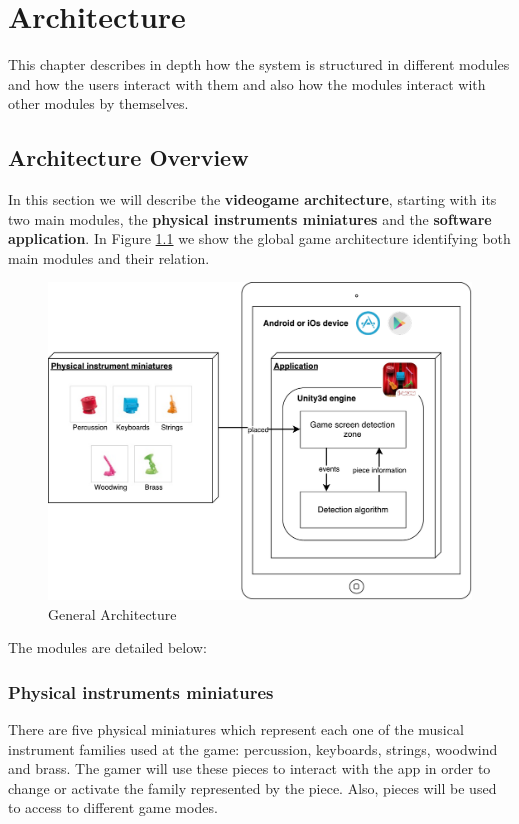 \chapter{Architecture}
\label{chap:architecture}


\begin{chapterintro}
This chapter describes in depth how the system is structured in different modules and how the users interact with them and also how the modules interact with other modules by themselves.
\end{chapterintro}

\cleardoublepage
\section{Architecture Overview}
In this section we will describe the \textbf{videogame architecture}, starting with its two main modules, the \textbf{physical instruments miniatures} and the \textbf{software application}. In Figure \ref{fig:ArchitectureGeneral} we show the global game architecture identifying both main modules and their relation.

\begin{figure}[ht!]
	\centering
	\includegraphics[width=400pt]{graphics/architecture/ArchitectureGeneral.pdf}
	\caption{General Architecture}
	\label{fig:ArchitectureGeneral}
\end{figure}

\FloatBarrier

The modules are detailed below:

\subsection{Physical instruments miniatures}
There are five physical miniatures which represent each one of the musical instrument families used at the game: percussion, keyboards, strings, woodwind and brass. The gamer will use these pieces to interact with the app in order to change or activate the family represented by the piece. Also, pieces will be used to access to different game modes.

